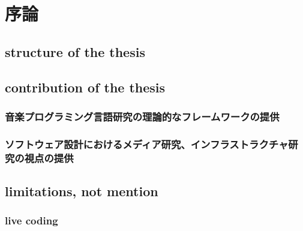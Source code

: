 \hypertarget{ux5e8fux8ad6}{%
\chapter{序論}\label{ux5e8fux8ad6}}

\hypertarget{structure-of-the-thesis}{%
\section{structure of the thesis}\label{structure-of-the-thesis}}

\hypertarget{contribution-of-the-thesis}{%
\section{contribution of the thesis}\label{contribution-of-the-thesis}}

\hypertarget{ux97f3ux697dux30d7ux30edux30b0ux30e9ux30dfux30f3ux30b0ux8a00ux8a9eux7814ux7a76ux306eux7406ux8ad6ux7684ux306aux30d5ux30ecux30fcux30e0ux30efux30fcux30afux306eux63d0ux4f9b}{%
\subsection{音楽プログラミング言語研究の理論的なフレームワークの提供}\label{ux97f3ux697dux30d7ux30edux30b0ux30e9ux30dfux30f3ux30b0ux8a00ux8a9eux7814ux7a76ux306eux7406ux8ad6ux7684ux306aux30d5ux30ecux30fcux30e0ux30efux30fcux30afux306eux63d0ux4f9b}}

\hypertarget{ux30bdux30d5ux30c8ux30a6ux30a7ux30a2ux8a2dux8a08ux306bux304aux3051ux308bux30e1ux30c7ux30a3ux30a2ux7814ux7a76ux30a4ux30f3ux30d5ux30e9ux30b9ux30c8ux30e9ux30afux30c1ux30e3ux7814ux7a76ux306eux8996ux70b9ux306eux63d0ux4f9b}{%
\subsection{ソフトウェア設計におけるメディア研究、インフラストラクチャ研究の視点の提供}\label{ux30bdux30d5ux30c8ux30a6ux30a7ux30a2ux8a2dux8a08ux306bux304aux3051ux308bux30e1ux30c7ux30a3ux30a2ux7814ux7a76ux30a4ux30f3ux30d5ux30e9ux30b9ux30c8ux30e9ux30afux30c1ux30e3ux7814ux7a76ux306eux8996ux70b9ux306eux63d0ux4f9b}}

\hypertarget{limitations-not-mention}{%
\section{limitations, not mention}\label{limitations-not-mention}}

\hypertarget{live-coding}{%
\subsection{live coding}\label{live-coding}}

